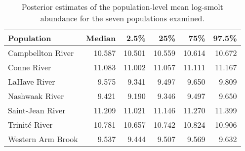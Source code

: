 \begin{table}[ht]
\centering
\caption{Posterior estimates of the population-level 
                    mean log-smolt abundance for the seven populations examined.} 
\begin{tabular}{lrrrrr}
  \hline
Population & Median & 2.5\% & 25\% & 75\% & 97.5\% \\ 
  \hline
Campbellton River & 10.587 & 10.501 & 10.559 & 10.614 & 10.672 \\ 
  Conne River & 11.083 & 11.002 & 11.057 & 11.111 & 11.167 \\ 
  LaHave River & 9.575 & 9.341 & 9.497 & 9.650 & 9.809 \\ 
  Nashwaak River & 9.421 & 9.190 & 9.346 & 9.497 & 9.650 \\ 
  Saint-Jean River & 11.209 & 11.021 & 11.146 & 11.270 & 11.399 \\ 
  Trinité River & 10.781 & 10.657 & 10.742 & 10.824 & 10.906 \\ 
  Western Arm Brook & 9.537 & 9.444 & 9.507 & 9.569 & 9.632 \\ 
   \hline
\end{tabular}
\end{table}
